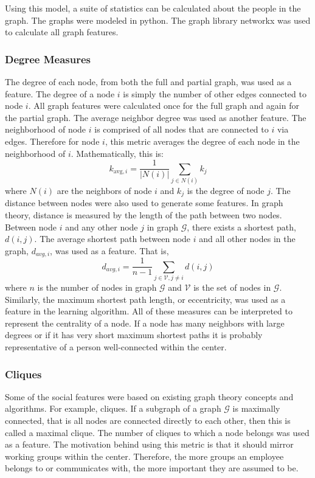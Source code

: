 \documentclass[12pt]{report}
\begin{document}
Using this model, a suite of statistics can be calculated about the people in the graph.  The graphs were modeled in python.  The graph library networkx \cite{hagberg-2008-exploring} was used to calculate all graph features.

\subsubsection{Degree Measures}
The degree of each node, from both the full and partial graph, was used as a feature.  
The degree of a node $i$ is simply the number of other edges connected to node $i$.
All graph features were calculated once for the full graph and again for the partial graph.
The average neighbor degree was used as another feature.
The neighborhood of node $i$ is comprised of all nodes that are connected to $i$ via edges.
Therefore for node $i$, this metric averages the degree of each node in the neighborhood of $i$.
Mathematically, this is:
\begin{equation}
k_{\text{avg},i} = \frac{1}{|N(i)|}\sum_{j \in N(i)}k_j
\end{equation}
where $N(i)$ are the neighbors of node $i$ and $k_j$ is the degree of node $j$.
The distance between nodes were also used to generate some features.
In graph theory, distance is measured by the length of the path between two nodes.
Between node $i$ and any other node $j$ in graph $\mathcal{G}$, there exists a shortest path, $d(i,j)$.
The average shortest path between node $i$ and all other nodes in the graph, $d_{avg,i}$, was used as a feature.
That is,
\begin{equation}
d_{avg,i} = \frac{1}{n-1}\sum_{j \in \mathcal{V}, j\neq i}d(i,j)
\end{equation}
where $n$ is the number of nodes in graph $\mathcal{G}$ and $\mathcal{V}$ is the set of nodes in $\mathcal{G}$.
Similarly, the maximum shortest path length, or eccentricity, was used as a feature in the learning algorithm.
All of these measures can be interpreted to represent the centrality of a node.
If a node has many neighbors with large degrees or if it has very short maximum shortest paths it is probably representative of a person well-connected within the center.

\subsubsection{Cliques}
Some of the social features were based on existing graph theory concepts and algorithms.
For example, cliques.
If a subgraph of a graph $\mathcal{G}$ is maximally connected, that is all nodes are connected directly to each other, then this is called a maximal clique.
The number of cliques to which a node belongs was used as a feature.
The motivation behind using this metric is that it should mirror working groups within the center.
Therefore, the more groups an employee belongs to or communicates with, the more important they are assumed to be.
\end{document}
